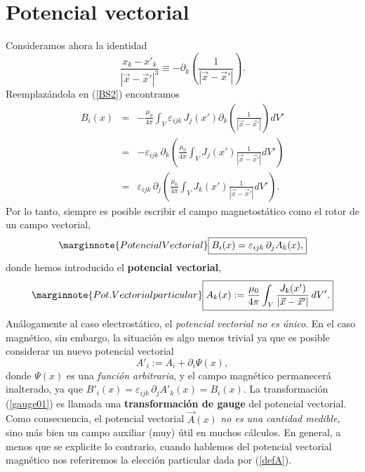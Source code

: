 \section{Potencial vectorial}
Consideramos ahora la identidad
\begin{equation}
\frac{x_k-x'_k}{\left\vert
\vec{x}-\vec{x}'\right\vert^3}\equiv -\partial_k\left(
\frac{1}{\left\vert\vec{x}-\vec{x}'\right\vert }\right).
\end{equation}
Reemplazándola en (\ref{BS2}) encontramos
\begin{eqnarray}
 B_i(x)&=&-\frac{\mu_0}{4\pi}\int_V\varepsilon_{ijk}\,J_j(x')
\partial_k\left(\frac{1}{\left\vert\vec{x}-\vec{x}'\right\vert }\right)dV'
\label{BS3} \\
&=&-\varepsilon_{ijk}\,\partial_k\left(\frac{\mu_0}{4\pi}\int_VJ_j(x')\frac{1}{
\left\vert\vec{x} -\vec{x}'\right\vert }dV'\right)\\
&=&\varepsilon_{ijk}\,\partial_j\left(\frac{\mu_0}{4\pi}\int_VJ_k(x')\frac{1}{
\left\vert\vec{x} -\vec{x}'\right\vert }dV'\right).
\end{eqnarray}
Por lo tanto, siempre es posible escribir el campo magnetostático como el rotor de un campo vectorial,
\begin{equation}\marginnote{Potencial Vectorial}
\boxed{B_i(x)=\varepsilon_{ijk}\,\partial_jA_k(x),}\label{rot-A}
\end{equation}
donde hemos introducido el \textbf{potencial vectorial},
\begin{equation}\marginnote{Pot. Vectorial particular}
\boxed{A_k(x):=\frac{\mu_0}{4\pi}\int_V\frac{J_k(x')}{\left\vert\vec{x}-\vec{x}
'\right\vert }\,dV'.}
\label{defA}
\end{equation}
Análogamente al caso electrostático, el \textit{potencial vectorial no es \'{u}nico}. En el caso magnético, sin embargo, la situación es algo menos trivial ya que es posible considerar un nuevo potencial vectorial
\begin{equation}
A'_i:=A_i+\partial_i\Psi(x), \label{gauge01}
\end{equation}
donde $\Psi(x)$ es una \textit{función arbitraria}, y el campo magnético
permanecerá inalterado, ya que $B'_i(x)=\varepsilon_{ijk}\,\partial_jA'_k(x)=B_i(x)$. La transformación (\ref{gauge01}) es llamada una \textbf{transformación de gauge}
del potencial vectorial. Como consecuencia, el potencial vectorial $\vec{A}(x)$
\textit{no es una cantidad medible}, sino más bien un campo auxiliar (muy)
útil en muchos cálculos. En general, a menos que se explicite lo contrario,
cuando hablemos del potencial vectorial magnético nos referiremos la elección particular 
dada por (\ref{defA}).


